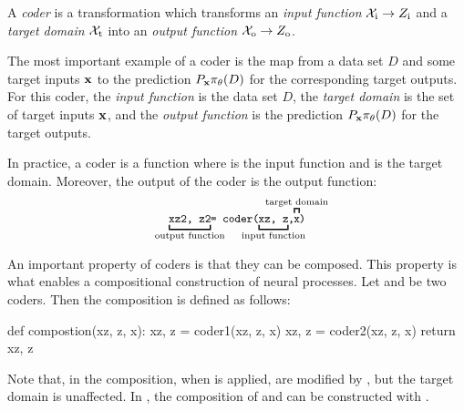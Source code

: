 \documentclass[12pt, twoside]{report}
\begin{document}
\begin{definition}[Coder]
    \label{def:coder}
    A \emph{coder} is a transformation which
    transforms an \emph{input function} $\X\ss{i} \to Z\ss{i}$
    and a \emph{target domain} $\X\ss{t}$
    into an \emph{output function} $\X\ss{o} \to Z\ss{o}$.
\end{definition}

The most important example of a coder is the map from a data set $D$ and some target inputs $\mathbf{x}$ to the prediction $P_{\mathbf{x}} \pi_\theta(D)$ for the corresponding target outputs.
For this coder,
the \emph{input function} is the data set $D$,
the \emph{target domain} is the set of target inputs $\mathbf{x}$, and
the \emph{output function} is the prediction $P_{\mathbf{x}} \pi_\theta(D)$ for the target outputs.

In practice, a coder is a function  where  is the input function and  is the target domain.
Moreover, the output of the coder  is the output function:
\begin{equation}
    \underbracket[1pt]{\code{xz2, z2\vphantom{)}}}_{\mathclap{\text{output function}}}
        \hspace{-2pt}
        \code{= coder(}
        \hspace{-2pt}
        \underbracket[1pt]{\code{xz, z\vphantom{)}}}_{\mathclap{\text{input function}}}
        \hspace{-2pt}
        \code{\vphantom{)},}
        \hspace{-2pt}
        \overbracket[1pt]{\code{\vphantom{(}x}}^{\mathclap{\text{target domain}}}
        \hspace{-2pt}
    \code{)}
\end{equation}

An important property of coders is that they can be composed.
This property is what enables a compositional construction of neural processes.
Let  and  be two coders.
Then the composition is defined as follows:
\begin{pythoncode}{\small}{}
def compostion(xz, z, x):
    xz, z = coder1(xz, z, x)
    xz, z = coder2(xz, z, x)
    return xz, z
\end{pythoncode}
Note that, in the composition, when  is applied,  are modified by , but the target domain  is unaffected.
In , the composition of  and  can be constructed with .
\end{document}
